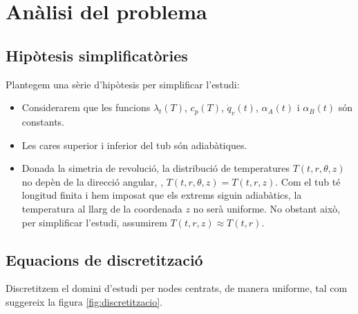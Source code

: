 \clearpage

\section{Anàlisi del problema}

\subsection{Hipòtesis simplificatòries}

Plantegem una sèrie d'hipòtesis per simplificar l'estudi:
\begin{itemize}
	\item Considerarem que les funcions $\lambda_t(T)$, $c_p(T)$, $\dot{q}_v(t)$, $\alpha_A(t)$ i $\alpha_B(t)$ són constants. 
	\item Les cares superior i inferior del tub són adiabàtiques.
	\item Donada la simetria de revolució, la distribució de temperatures $T(t, r, \theta, z)$ no depèn de la direcció angular, \ie, $T(t, r, \theta, z) = T(t, r, z)$. Com el tub té longitud finita i hem imposat que els extrems siguin adiabàtics, la temperatura al llarg de la coordenada $z$ no serà uniforme. No obstant això, per simplificar l'estudi, assumirem $T(t,r,z) \approx T(t,r)$.
\end{itemize}

\subsection{Equacions de discretització}

Discretitzem el domini d'estudi per nodes centrats, de manera uniforme, tal com suggereix la figura \ref{fig:discretitzacio}.

